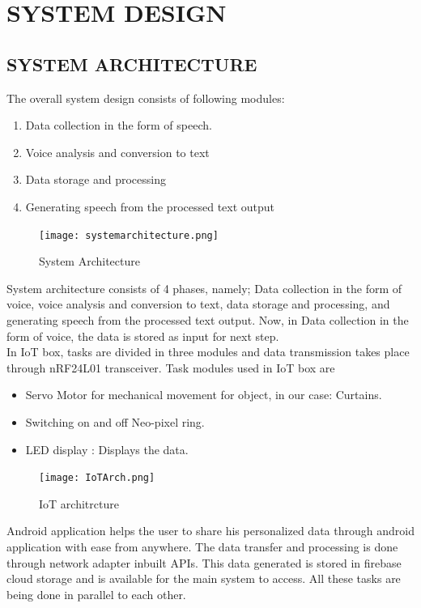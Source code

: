 \documentclass[12pt]{extreport}
\begin{document}

\chapter{SYSTEM DESIGN}

\section{SYSTEM ARCHITECTURE}
The overall system design consists of following modules:
\begin{enumerate}
\item Data collection in the form of speech.
\item Voice analysis and conversion to text
\item Data storage and processing
\item Generating speech from the processed text output
\end{enumerate}

    \begin{figure}[H]
	\texttt{[image: systemarchitecture.png]}\\
	\caption{System Architecture}
	\end{figure}

\noindent	
System architecture consists of 4 phases, namely; Data collection in the form of voice, voice analysis and conversion to text, data storage and processing, and generating speech from the processed text output. Now, in  Data collection in the form of voice, the data is stored as input for next step. \\

\noindent
In IoT box, tasks are divided in three modules and data transmission takes place through nRF24L01 transceiver. Task modules used in IoT box are 
\begin{itemize}
\item Servo Motor for mechanical movement for object, in our case: Curtains.
\item Switching on and off Neo-pixel ring.
\item LED display : Displays the data.
\end{itemize}
\noindent
\begin{figure}
    \centering
    \texttt{[image: IoTArch.png]}
    \caption{IoT architrcture}
\end{figure}
\newpage
\noindent
Android application helps the user to share his personalized data through android application with ease from anywhere. The data transfer and processing is done through network adapter inbuilt APIs. This data generated is stored in firebase cloud storage and is available for the main system to access. All these tasks are being done in parallel to each other.\\
\end{document}
